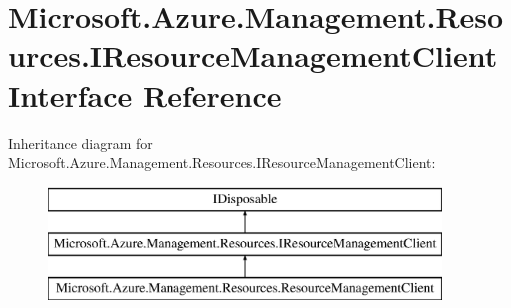\hypertarget{interface_microsoft_1_1_azure_1_1_management_1_1_resources_1_1_i_resource_management_client}{}\section{Microsoft.\+Azure.\+Management.\+Resources.\+I\+Resource\+Management\+Client Interface Reference}
\label{interface_microsoft_1_1_azure_1_1_management_1_1_resources_1_1_i_resource_management_client}


 


Inheritance diagram for Microsoft.\+Azure.\+Management.\+Resources.\+I\+Resource\+Management\+Client\+:\begin{figure}[H]
\begin{center}
\leavevmode
\includegraphics[height=3.000000cm]{interface_microsoft_1_1_azure_1_1_management_1_1_resources_1_1_i_resource_management_client}
\end{center}
\end{figure}
